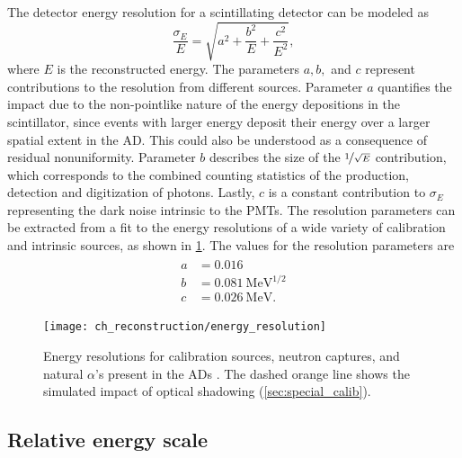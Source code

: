 The detector energy resolution for a scintillating detector can be modeled as
\cite{energy_resolution}
\begin{equation}
    \frac{\sigma_E}{E} = \sqrt{a^2 + \frac{b^2}{E} + \frac{c^2}{E^2}},
\end{equation}
where $E$ is the reconstructed energy.
The parameters $a,b,$ and $c$ represent contributions to the resolution
from different sources.
Parameter $a$ quantifies the impact due to the non-pointlike nature
of the energy depositions in the scintillator,
since events with larger energy deposit their energy over a larger spatial extent
in the AD.
This could also be understood as a consequence of residual nonuniformity.
Parameter $b$ describes the size of the $\nicefrac{1}{\sqrt{E}}$ contribution,
which corresponds to the combined counting statistics of
the production, detection and digitization of photons.
Lastly, $c$ is a constant contribution to $\sigma_E$
representing the dark noise intrinsic to the PMTs.
The resolution parameters can be extracted from a fit
to the energy resolutions of a wide variety of calibration and intrinsic sources,
as shown in \cref{fig:resolution}.
The values for the resolution parameters are \cite{ngd2016}
\begin{align}\label{eq:resolution_params}
    \begin{split}
        a &= 0.016 \\
        b &= \SI{0.081}{\MeV\tothe{1/2}} \\
        c &= \SI{0.026}{\MeV}.
    \end{split}
\end{align}

\begin{figure}
    \centering
    \texttt{[image: ch\_reconstruction/energy\_resolution]}
    \caption[Energy resolution]{Energy resolutions for calibration sources, neutron captures,
        and natural $\alpha$'s present in the ADs \cite{ngd2016}.
        The dashed orange line shows the simulated impact
        of optical shadowing (\cref{sec:special_calib}).
    }
    \label{fig:resolution}
\end{figure}


\subsection{Relative energy scale}
\label{subsec:rel_energyscale}

